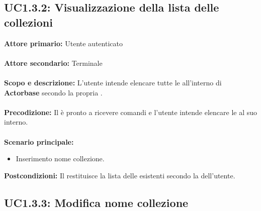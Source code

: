 \documentclass{scalatekids-article}
\begin{document}
\subsection{UC1.3.2: Visualizzazione della lista delle collezioni}

\textbf{Attore primario:} Utente autenticato\\ \\
\textbf{Attore secondario:} Terminale\\ \\
\textbf{Scopo e descrizione:} L'utente intende elencare tutte le  all'interno di \textbf{Actorbase} secondo la propria .\\ \\
\textbf{Precodizione:} Il  è pronto a ricevere comandi e l'utente intende elencare le  al suo interno.\\ \\
\textbf{Scenario principale:}
\begin{itemize}
  \item Inserimento nome collezione.
\end{itemize}
\textbf{Postcondizioni:} Il  restituisce la lista delle  esistenti secondo la  dell'utente.

\subsection{UC1.3.3: Modifica nome collezione}
\end{document}
